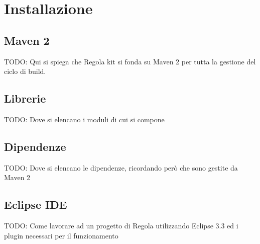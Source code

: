 \chapter{Installazione}\label{chap:installazione}

\section{Maven 2}
TODO: Qui si spiega che Regola kit si fonda su Maven 2 per tutta la gestione del ciclo di build.

\section{Librerie}
TODO: Dove si elencano i moduli di cui si compone

\section{Dipendenze}
TODO: Dove si elencano le dipendenze, ricordando però che sono gestite da Maven 2

\section{Eclipse IDE}
TODO: Come lavorare ad un progetto di Regola utilizzando Eclipse 3.3 ed i plugin necessari per il funzionamento